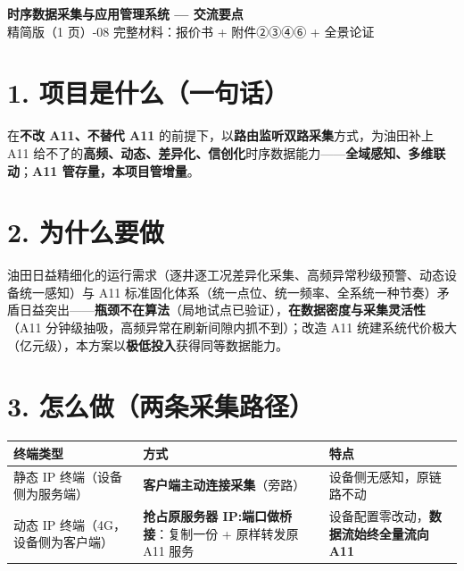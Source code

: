 \documentclass[10pt,a4paper]{ctexart}
\begin{document}
\begin{center}
{\Large\bfseries 时序数据采集与应用管理系统 — 交流要点}\\[2pt]
{\small 精简版（1 页）-08 \quad 完整材料：报价书 + 附件②③④⑥ + 全景论证}
\end{center}

\vspace{0.2em}
\noindent\hrulefill
\vspace{0.3em}

\section*{1. 项目是什么（一句话）}

在\textbf{不改 A11、不替代 A11} 的前提下，以\textbf{路由监听双路采集}方式，为油田补上 A11 给不了的\textbf{高频、动态、差异化、信创化}时序数据能力——\textbf{全域感知、多维联动}；\textbf{A11 管存量，本项目管增量}。

\section*{2. 为什么要做}

油田日益精细化的运行需求（逐井逐工况差异化采集、高频异常秒级预警、动态设备统一感知）与 A11 标准固化体系（统一点位、统一频率、全系统一种节奏）矛盾日益突出——\textbf{瓶颈不在算法}（局地试点已验证），\textbf{在数据密度与采集灵活性}（A11 分钟级抽吸，高频异常在刷新间隙内抓不到）；改造 A11 统建系统代价极大（亿元级），本方案以\textbf{极低投入}获得同等数据能力。

\section*{3. 怎么做（两条采集路径）}

\begin{table}[H]\centering
\begin{tabular}{p{4.6cm} p{4.9cm} p{4.6cm}}
\toprule
\textbf{终端类型} & \textbf{方式} & \textbf{特点} \\
\midrule
静态 IP 终端（设备侧为服务端） & \textbf{客户端主动连接采集}（旁路） & 设备侧无感知，原链路不动 \\
动态 IP 终端（4G，设备侧为客户端） & \textbf{抢占原服务器 IP:端口做桥接}：复制一份 + 原样转发原 A11 服务 & 设备配置零改动，\textbf{数据流始终全量流向 A11} \\
\bottomrule
\end{tabular}
\end{table}
\end{document}
